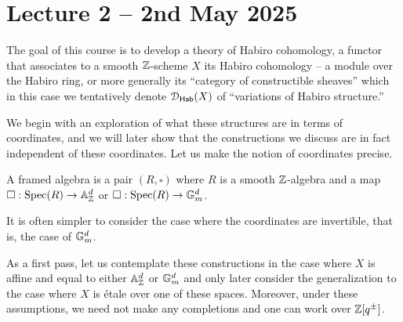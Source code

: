 \section{Lecture 2 -- 2nd May 2025}\label{sec: lecture 2}
The goal of this course is to develop a theory of Habiro cohomology, a functor that associates to a smooth $\mathbb{Z}$-scheme $X$ its Habiro cohomology -- a module over the Habiro ring, or more generally its ``category of constructible sheaves'' which in this case we tentatively denote $\EuScript{D}_{\mathsf{Hab}}(X)$ of ``variations of Habiro structure.''

We begin with an exploration of what these structures are in terms of coordinates, and we will later show that the constructions we discuss are in fact independent of these coordinates. Let us make the notion of coordinates precise. 
\begin{definition}\label{def: framed algebra}
    A framed algebra is a pair $(R,\square)$ where $R$ is a smooth $\mathbb{Z}$-algebra and a map $\square:\operatorname{Spec}(R)\to\mathbb{A}^{d}_{\mathbb{Z}}$ or $\square:\operatorname{Spec}(R)\to\mathbb{G}_{m}^{d}$. 
\end{definition}
\begin{remark}
    It is often simpler to consider the case where the coordinates are invertible, that is, the case of $\mathbb{G}_{m}^{d}$. 
\end{remark}
As a first pass, let us contemplate these constructions in the case where $X$ is affine and equal to either $\mathbb{A}^{d}_{\mathbb{Z}}$ or $\mathbb{G}_{m}^{d}$ and only later consider the generalization to the case where $X$ is \'{e}tale over one of these spaces. Moreover, under these assumptions, we need not make any completions and one can work over $\mathbb{Z}[q^{\pm}]$.

